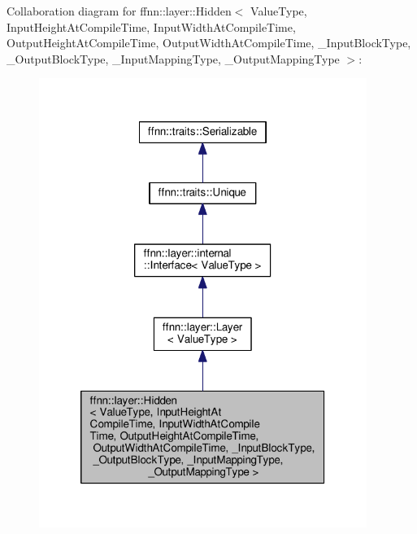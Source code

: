 Collaboration diagram for ffnn\-:\-:layer\-:\-:Hidden$<$ Value\-Type, Input\-Height\-At\-Compile\-Time, Input\-Width\-At\-Compile\-Time, Output\-Height\-At\-Compile\-Time, Output\-Width\-At\-Compile\-Time, \-\_\-\-Input\-Block\-Type, \-\_\-\-Output\-Block\-Type, \-\_\-\-Input\-Mapping\-Type, \-\_\-\-Output\-Mapping\-Type $>$\-:
\nopagebreak
\begin{figure}[H]
\begin{center}
\leavevmode
\includegraphics[width=302pt]{classffnn_1_1layer_1_1_hidden__coll__graph}
\end{center}
\end{figure}
